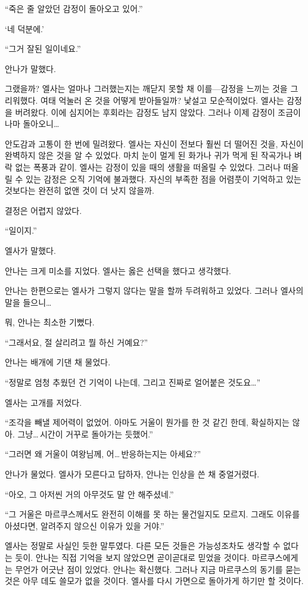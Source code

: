 ``죽은 줄 알았던 감정이 돌아오고 있어.''

`네 덕분에.'

``그거 잘된 일이네요.''

안나가 말했다.

그랬을까? 엘사는 얼마나 그러했는지는 깨닫지 못할 채 이를—감정을 느끼는 것을 그리워했다. 여태 억눌러 온 것을 어떻게 받아들일까? 낯설고 모순적이었다. 엘사는 감정을 버려왔다. 이에 심지어는 후회라는 감정도 남지 않았다. 그러나 이제 감정이 조금이나마 돌아오니\ldots

안도감과 고통이 한 번에 밀려왔다. 엘사는 자신이 전보다 훨씬 더 떨어진 것을, 자신이 완벽하지 않은 것을 알 수 있었다. 마치 눈이 멀게 된 화가나 귀가 먹게 된 작곡가나 벼락 없는 폭풍과 같이. 엘사는 감정이 있을 때의 생활을 떠올릴 수 있었다. 그러나 떠올릴 수 있는 감정은 오직 기억에 불과했다. 자신의 부족한 점을 어렴풋이 기억하고 있는 것보다는 완전히 없앤 것이 더 낫지 않을까.

결정은 어렵지 않았다.

`` 일이지.''

엘사가 말했다.

안나는 크게 미소를 지었다. 엘사는 옳은 선택을 했다고 생각했다.

\textbreak

안나는 한편으로는 엘사가 그렇지 않다는 말을 할까 두려워하고 있었다. 그러나 엘사의 말을 들으니\ldots

뭐, 안나는 최소한 기뻤다.

``그래서요, 절 살리려고 뭘 하신 거예요?''

안나는 배개에 기댄 채 물었다.

``정말로 엄청 추웠던 건 기억이 나는데, 그리고 진짜로 얼어붙은 것도요\ldots''

엘사는 고개를 저었다.

``조각을 빼낼 제어력이 없었어. 아마도 거울이 뭔가를 한 것 같긴 한데, 확실하지는 않아. 그냥\ldots\,시간이 거꾸로 돌아가는 듯했어.''

``그러면 왜 거울이 여왕님께, 어\ldots\,반응하는지는 아세요?''

안나가 물었다. 엘사가 모른다고 답하자, 안나는 인상을 쓴 채 중얼거렸다.

``아오, 그 아저씬 거의 아무것도 말 안 해주셨네.''

``그 거울은 마르쿠스께서도 완전히 이해를 못 하는 물건일지도 모르지. 그래도 이유를 아셨다면, 알려주지 않으신 이유가 있을 거야.''

엘사는 정말로 사실인 듯한 말투였다. 다른 모든 것들은 가능성조차도 생각할 수 없다는 듯이. 안나는 직접 기억을 보지 않았으면 곧이곧대로 믿었을 것이다. 마르쿠스에게는 무언가 어긋난 점이 있었다. 안나는 확신했다. 그러나 지금 마르쿠스의 동기를 묻는 것은 아무 데도 쓸모가 없을 것이다. 엘사를 다시 가면으로 돌아가게 하기만 할 것이다.

